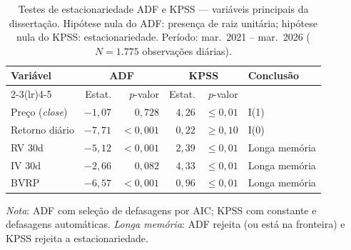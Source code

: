 \begin{table}[H]
\centering
\small
\caption{Testes de estacionariedade ADF e KPSS --- variáveis principais da dissertação. Hipótese nula do ADF: presença de raiz unitária; hipótese nula do KPSS: estacionariedade. Período: mar.\ 2021 -- mar.\ 2026 ($N = 1{.}775$ observações diárias).}
\label{tab:adf_kpss}
\begin{tabular}{lrrrrl}
\toprule
Variável & \multicolumn{2}{c}{ADF} & \multicolumn{2}{c}{KPSS} & Conclusão \\
\cmidrule(lr){2-3}\cmidrule(lr){4-5}
 & Estat. & $p$-valor & Estat. & $p$-valor & \\
\midrule
Preço (\textit{close}) & $-1{,}07$ & $0{,}728$ & $4{,}26$ & ${\leq}0{,}01$ & I(1) \\
Retorno diário & $-7{,}71$ & $< 0{,}001$ & $0{,}22$ & ${\geq}0{,}10$ & I(0) \\
RV 30d & $-5{,}12$ & $< 0{,}001$ & $2{,}39$ & ${\leq}0{,}01$ & Longa memória \\
IV 30d & $-2{,}66$ & $0{,}082$ & $4{,}33$ & ${\leq}0{,}01$ & Longa memória \\
BVRP & $-6{,}57$ & $< 0{,}001$ & $0{,}96$ & ${\leq}0{,}01$ & Longa memória \\
\bottomrule
\end{tabular}
\par\smallskip
\footnotesize\textit{Nota}: ADF com seleção de defasagens por AIC; KPSS com constante e defasagens automáticas. \textit{Longa memória}: ADF rejeita (ou está na fronteira) e KPSS rejeita a estacionariedade.
\end{table}
